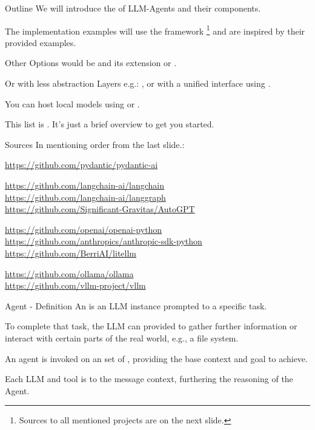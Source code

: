 \documentclass[12pt, aspectratio=169, usepdftitle=false]{beamer}
\newcommand{\ms}[0]{\medskip}
\begin{document}
\begin{frame}{Outline}
	We will introduce the  of LLM-Agents and their components.
	
	\ms
	
	The implementation examples will use the framework \footnote{Sources to all mentioned projects are on the next slide.} and are inspired by their provided examples.
	
	\ms
	
	Other Options would be  and its extension  or \tb{AutoGPT}.
	
	\ms
	
	Or with less abstraction Layers e.g.: ,  or with a unified interface using \tb{LiteLLM}.
	
	\ms
	
	You can host local models using  or \tb{vLLM}.
	
	\ms
	
	This list is . It's just a brief overview to get you started.
\end{frame}

\begin{frame}{Sources}
In mentioning order from the last slide.:

\ms


\url{https://github.com/pydantic/pydantic-ai}

\medskip

\url{https://github.com/langchain-ai/langchain}\\ \url{https://github.com/langchain-ai/langgraph} \\ \url{https://github.com/Significant-Gravitas/AutoGPT}

\medskip

\url{https://github.com/openai/openai-python}\\ \url{https://github.com/anthropics/anthropic-sdk-python}\\ \url{https://github.com/BerriAI/litellm}\\

\ms

\url{https://github.com/ollama/ollama}\\
\url{https://github.com/vllm-project/vllm}
\end{frame}



\begin{frame}{Agent - Definition}
An  is an LLM instance prompted to  a specific {task}.

\medskip

To complete that task, the LLM can  provided  to gather further information or interact with certain parts of the real world, e.g., a file system.

\medskip

An agent is invoked on an  set of , providing the base context and goal to achieve.

\medskip

Each LLM and tool  is  to the message context, furthering the reasoning of the Agent.
\end{frame}
\end{document}
